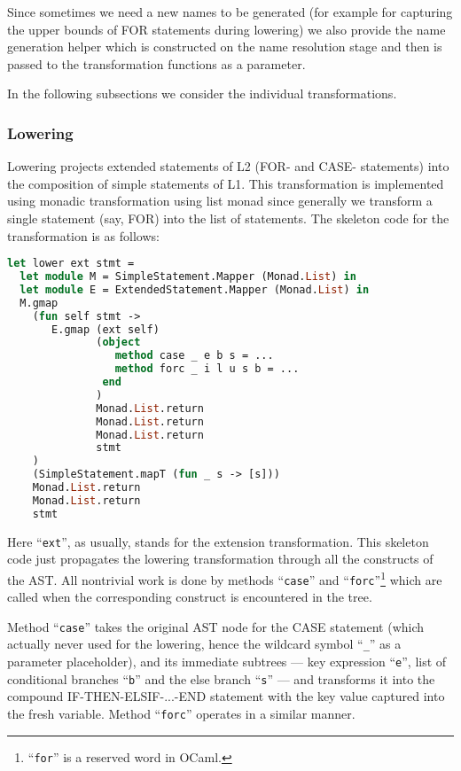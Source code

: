 Since sometimes we need a new names to be generated (for example for capturing the upper bounds of
FOR statements during lowering) we also provide the name generation helper which is constructed
on the name resolution stage and then is passed to the transformation functions as a parameter.

In the following subsections we consider the individual transformations.

\subsubsection{Lowering}

Lowering projects extended statements of L2 (FOR- and CASE- statements) into the composition
of simple statements of L1. This transformation is implemented using monadic transformation
using list monad since generally we transform a single statement (say, FOR) into the list
of statements. The skeleton code for the transformation is as follows:

\begin{lstlisting}[language=ocaml]
let lower ext stmt =
  let module M = SimpleStatement.Mapper (Monad.List) in 
  let module E = ExtendedStatement.Mapper (Monad.List) in
  M.gmap 
    (fun self stmt ->
       E.gmap (ext self)
              (object
                 method case _ e b s = ...
                 method forc _ i l u s b = ...
               end
              ) 
              Monad.List.return 
              Monad.List.return 
              Monad.List.return 
              stmt
    )
    (SimpleStatement.mapT (fun _ s -> [s])) 
    Monad.List.return 
    Monad.List.return
    stmt
\end{lstlisting}

Here ``\lstinline{ext}'', as usually, stands for the extension transformation. This skeleton
code just propagates the lowering transformation through all the constructs of the AST. All
nontrivial work is done by methods ``\lstinline{case}'' and 
``\lstinline{forc}''\footnote{``\lstinline{for}'' is a reserved word in OCaml.} which are 
called when the corresponding construct is encountered in the tree.

Method ``\lstinline{case}'' takes the original AST node for the CASE statement 
(which actually never used for the lowering, hence the wildcard symbol ``\lstinline{_}'' 
as a parameter placeholder), and its immediate subtrees --- key expression ``\lstinline{e}'',
list of conditional branches ``\lstinline{b}'' and the else branch ``\lstinline{s}'' --- and transforms it 
into the compound \mbox{IF-THEN-ELSIF-...-END} statement with the key value captured into the fresh variable.
Method ``\lstinline{forc}'' operates in a similar manner.

